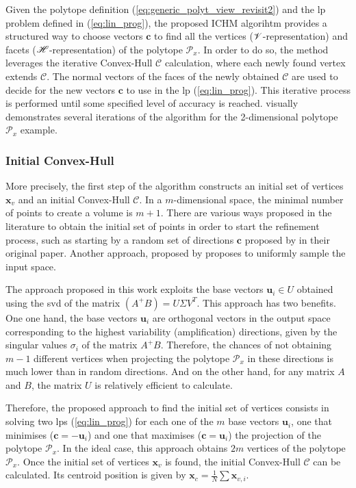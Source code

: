Given the polytope definition (\ref{eq:generic_polyt_view_revisit2}) and the \gls{lp} problem defined in (\ref{eq:lin_prog}), the proposed ICHM algorihtm provides a structured way to choose vectors $\bm{c}$ to find all the vertices ($\mathscr{V}$-representation) and facets ($\mathscr{H}$-representation) of the polytope $\mathcal{P}_x$. 
In order to do so, the method leverages the iterative Convex-Hull $\mathcal{C}$ calculation, where each newly found vertex extends $\mathcal{C}$. The normal vectors of the faces of the newly obtained $\mathcal{C}$ are used to decide for the new vectors $\bm{c}$ to use in the \gls{lp} (\ref{eq:lin_prog}). This iterative process is performed until some specified level of accuracy is reached.  visually demonstrates several iterations of the algorithm for the 2-dimensional polytope $\mathcal{P}_x$ example.

\subsubsection{Initial Convex-Hull}More precisely, the first step of the algorithm constructs an initial set of vertices $\bm{x}_v$ and an initial Convex-Hull $\mathcal{C}$. In a $m$-dimensional space, the minimal number of points to create a volume is $m\!+\!1$.  There are various ways proposed in the literature to obtain the initial set of points in order to start the refinement process, such as starting by a random set of directions $\bm{c}$ proposed by \citet{lassez1992quantifier} in their original paper. Another approach, proposed by \citet{DelPrete2016Fast} proposes to uniformly sample the input space.

The approach proposed in this work exploits the base vectors $\bm{u}_i\in U$ obtained using the \gls{svd} of the matrix $(A^+B) = U\Sigma V^T$. This approach has two benefits. One one hand, the base vectors $\bm{u}_i$ are orthogonal vectors in the output space corresponding to the 
highest variability (amplification) directions, given by the singular values $\sigma_i$ of the matrix $A^+B$.
Therefore, the chances of not obtaining $m-1$ different vertices when projecting the polytope $\mathcal{P}_x$ in these directions is much lower than in random directions. And on the other hand, for any matrix $A$ and $B$, the matrix $U$ is relatively efficient to calculate.

Therefore, the proposed approach to find the initial set of vertices consists in solving two \glspl{lp} (\ref{eq:lin_prog}) for each one of the $m$ base vectors $\bm{u}_i$, one that minimises ($\bm{c} = -\bm{u}_i$) and one that maximises ($\bm{c} = \bm{u}_i$) the projection of the polytope $\mathcal{P}_x$. In the ideal case, this approach obtains $2m$ vertices of the polytope $\mathcal{P}_x$. Once the initial set of vertices $\bm{x}_v$ is found, the initial Convex-Hull $\mathcal{C}$ can be calculated. Its centroid position is given by $\bm{x}_c\!=\!\frac{1}{N}\!\sum\bm{x}_{v,i}$. 




